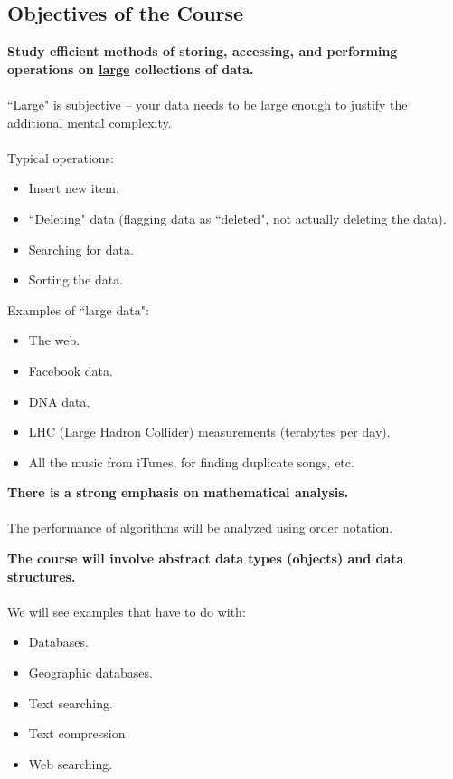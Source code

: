 \documentclass[]{article}
\theoremstyle{definition}
\begin{document}
		\subsection{Objectives of the Course}
			\begin{itemize}
				\begin{item}
					\textbf{Study efficient methods of storing, accessing, and performing operations on \underline{large} collections of data.} \\ \\
					``Large" is subjective -- your data needs to be large enough to justify the additional mental complexity. \\ \\
					Typical operations:
					\begin{itemize}
						\item Insert new item.
						\item ``Deleting" data (flagging data as ``deleted", not actually deleting the data).
						\item Searching for data.
						\item Sorting the data. \\
					\end{itemize}
				
					Examples of ``large data":
					\begin{itemize}
						\item The web.
						\item Facebook data.
						\item DNA data.
						\item LHC (Large Hadron Collider) measurements (terabytes per day).
						\item All the music from iTunes, for finding duplicate songs, etc.
					\end{itemize}
				\end{item}
				
				\begin{item}
					\textbf{There is a strong emphasis on mathematical analysis.} \\ \\
					The performance of algorithms will be analyzed using order notation.
				\end{item}
				
				\begin{item}
					\textbf{The course will involve abstract data types (objects) and data structures.} \\ \\
					We will see examples that have to do with:
					\begin{itemize}
						\item Databases.
						\item Geographic databases.
						\item Text searching.
						\item Text compression.
						\item Web searching.
					\end{itemize}
				\end{item}
			\end{itemize}
			
\end{document}
